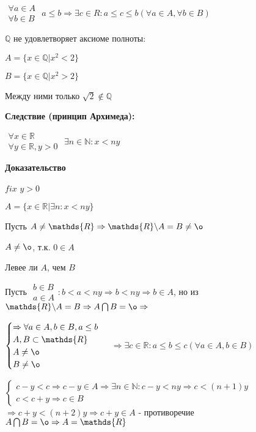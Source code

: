 \documentclass[14pt, letter paper]{article}
\begin{document}
$\begin{gathered} \forall a \in A \\ \forall b \in B \end{gathered}$ $a \leq b \Rightarrow \exists c \in R: a \leq c \leq b (\forall a \in A, \forall b \in B)$

$\mathds{Q}$ не удовлетворяет аксиоме полноты:

$A = \{ x \in \mathds{Q} | x^2 < 2 \}$

$B = \{ x \in \mathds{Q} | x^2 > 2 \}$

Между ними только $\sqrt{2} \notin \mathds{Q}$

\textbf{Следствие (принцип Архимеда):}

$\begin{gathered}
    \forall x \in \mathds{R} \\
    \forall y \in \mathds{R}, y > 0
\end{gathered}$
$\exists n \in \mathds{N} : x < ny$

\begin{center}
    \textbf{Доказательство}
\end{center}

$fix$ $y > 0$

$A = \{ x \in \mathds{R} | \exists n : x < ny\}$

Пусть $A \neq \mathds{R} \Rightarrow \mathds{R} \backslash A = B \neq \o$

$A \neq \o$, т.к. $0 \in A$

Левее ли $A$, чем $B$

Пусть $\begin{gathered} b \in B \\ a \in A \end{gathered}: b < a < ny \Rightarrow b < ny \Rightarrow b \in A$, но из $\mathds{R} \backslash A = B \Rightarrow A \bigcap B = \o \Rightarrow$ 

$\begin{cases}
\Rightarrow \forall a \in A, b \in B, a \leq b \\
A, B \subset \mathds{R} \\ 
A \neq \o \\
B \neq \o 
\end{cases}$
$\Rightarrow \exists c \in \mathds{R}: a \leq b \leq c (\forall a \in A, b \in B)$

$\begin{cases}
c - y < c \Rightarrow c - y \in A \Rightarrow \exists n \in \mathds{N} : c - y < ny \Rightarrow c < (n+1)y \\
c < c + y \Rightarrow c \in B
\end{cases}$
$\Rightarrow c + y < (n+2)y \Rightarrow c + y \in A$ - противоречие $A \bigcap B = \o \Rightarrow A = \mathds{R}$
\end{document}
